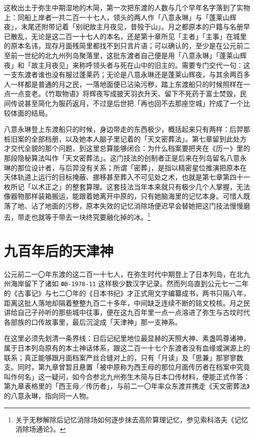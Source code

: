这枚出土于弥生中期湿地的木简，第一次把东渡的人数与几个早年名字落到了实物上：同船上岸者一共二百一十七人，领头的两人作「八意永琳」与「蓬莱山辉夜」，末尾还附带记着「别祀故主月夜见，昔殁于山」。月之都原本的户籍与名册早已散乱，无论是这二百一十七人的本名，还是第十章所见「主者」「主事」在城里的原本名讳，现存月面残简里都找不到只言片语；可以确认的，至少是在公元前二至前一世纪的北九州列岛聚落里，这批东渡者自己便是用「八意永琳」「蓬莱山辉夜」和「故主月夜见」来称呼领头者与死在山中的旧主的。需要专门交代一句：这一支东渡者谁也没有服过蓬莱药；无论是八意永琳还是蓬莱山辉夜，与其余两百多人一样都是普通的月之民，一落地面便已沾染污秽，踏上东渡船只的时候照样在一点一点变老。《竹取物语》将辉夜写成披天羽衣升天、留下不死药于富士焚毁，民间传说甚至简化为服药返月，不过是后世把「再也回不去那座空城」拧成了一个比较体面的结局。

八意永琳登上东渡船只的时候，身边带走的东西极少，概括起来只有两样：后羿那桩旧案的全部档册，以及她本人脑子里记着的「天文密葬法」。第七章留到此处方才交代全貌的那个问题，到这里总算能够闭合：为什么档案要把夹在《历一》里的那段隐秘算法叫作「天文密葬法」。这门技法的创制者正是后来在列岛留名八意永琳的那位设计者，与后羿没有关系；所谓「密葬」，是指以精密星位推演把原本在天体轨道上运行的目标掩蔽、挪移甚至葬入不可见处之术，也就是第七章第四十一枚所记「以术正之」的整套算理。这套技法当年本来就只有极少几个人掌握，无法像器物那样装箱搬运，能跟着她离开中原的，只有她脑海里的记忆本身。可惜人既落了地、沾了地面的污秽，原本失效的记忆消除场便迟早会替她把这门技法慢慢磨去，带走也就等于带去一块终究要融化掉的冰。\footnote{关于无秽解除后记忆消除场如何逐步抹去高阶算理记忆，参见索科洛夫《记忆消除场通论》。}

\section{九百年后的天津神}

公元前二一〇年东渡的这二百一十七人，在弥生时代中期登上了日本列岛，在北九州海岸留下了诸如 \texttt{ФВ-1978-11} 这样极少数汉字记录。然而列岛直到公元七一二年的《古事记》与七二〇年的《日本书纪》才正式用文字编纂成书，两书只隔八年，距离这批人落地却隔着整整九百二十多年，中间缺乏连续不断的铭文校核。月之民讲给自己子孙听的那些城中往事，便在这九百年里一点一点溶进了弥生与古坟时代各部族的口传故事里，最后沉淀成「天津神」那一支神系。

在这里必须先划清一条界线：日后记纪里地位最显赫的天照大神、素盏鸣尊诸神，属于日本列岛原有的本土神话体系，跟这二百一十七个东渡者没有血缘或渊源上的联系；真正能够跟月面档案严丝合缝对上的，只有「月读」及「思兼」那寥寥数支。同时，第九章曾暂且悬置「被中原称为西王母的那位月面传历者在档案中究竟叫作何名」这一疑问，如今合参北九州弥生木简与日本口传材料，便能正式作答：第九章表格里的「西王母／传历者」，与前二一〇年率众东渡并携走《天文密葬法》的八意永琳，指向同一人物。

